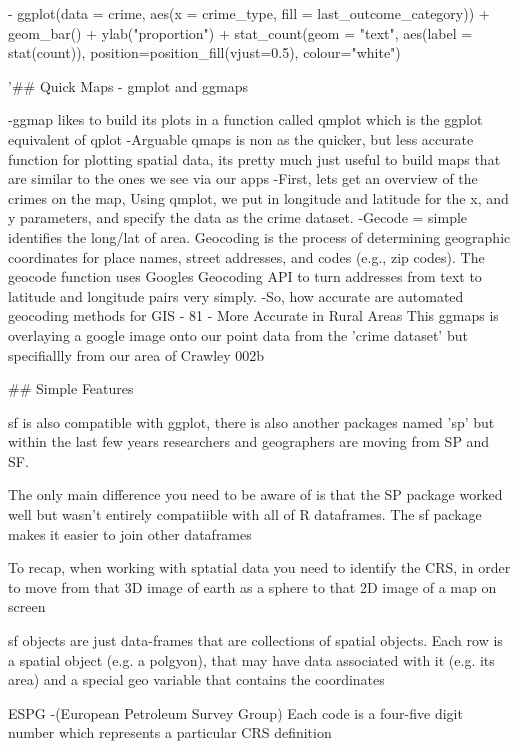 \documentclass[12pt]{article}
\begin{document}
- ggplot(data = crime, aes(x = crime_type, fill = last_outcome_category)) +
    geom_bar() + ylab("proportion") +
    stat_count(geom = "text", 
             aes(label = stat(count)),
             position=position_fill(vjust=0.5), colour="white")



'## Quick Maps - gmplot and ggmaps

-ggmap likes to build its plots in a function called qmplot which is the ggplot equivalent of qplot
-Arguable qmaps is non as the quicker, but less accurate function for plotting spatial data, its pretty much just useful to build maps that are similar to the ones we see via our apps 
-First, lets get an overview of the crimes on the map, Using qmplot, we put in longitude and latitude for the x, and y parameters, and specify the data as the crime dataset.
-Gecode = simple identifies the long/lat of area. Geocoding is the process of determining geographic coordinates for place names, street addresses, and codes (e.g., zip codes).
The geocode function uses Googles Geocoding API to turn addresses from text to latitude and longitude pairs very simply.
-So, how accurate are automated geocoding methods for GIS
- 81%
- More Accurate in Rural Areas
This ggmaps is overlaying a google image onto our point data from the 'crime dataset' but specifiallly from our area of Crawley 002b


## Simple Features 


sf is also compatible with ggplot, there is also another packages named 'sp' but within the last few years researchers and geographers are moving from SP and SF. 

The only main difference you need to be aware of is that the SP package worked well but wasn't entirely compatiible with all of R dataframes. The sf package makes it easier to join other dataframes


To recap, when working with sptatial data you need to identify the CRS, in order to move from that 3D image of earth as a sphere to that 2D image of a map on screen

sf objects are just data-frames that are collections of spatial objects. Each row is a spatial object (e.g. a polgyon), that may have data associated with it (e.g. its area) and a special geo variable that contains the coordinates


ESPG -(European Petroleum Survey Group) Each code is a four-five digit number which represents a particular CRS definition
\end{document}
